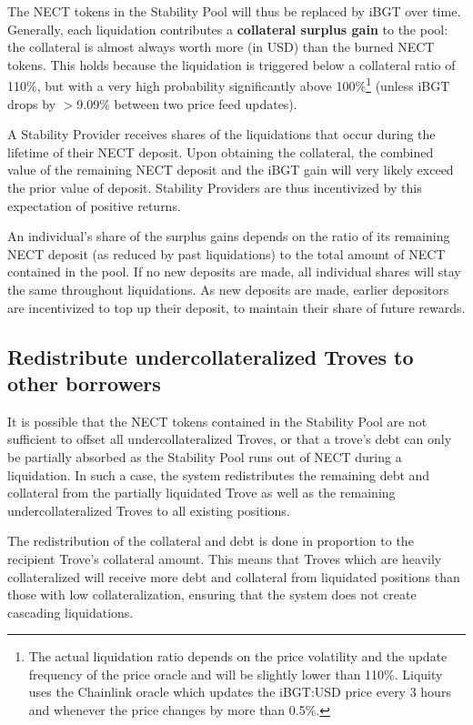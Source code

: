 \documentclass{article}
\begin{document}
The NECT tokens in the Stability Pool will thus be replaced by iBGT over time. Generally, each liquidation contributes a \textbf{collateral surplus gain} to the pool: the collateral is almost always worth more (in USD) than the burned NECT tokens. This holds because the liquidation is triggered below a collateral ratio of 110\%, but with a very high probability significantly above 100\%\footnote{The actual liquidation ratio depends on the price volatility and the update frequency of the price oracle and will be slightly lower than 110\%. Liquity uses the Chainlink oracle which updates the iBGT:USD price every 3 hours and whenever the price changes by more than 0.5\%.} (unless iBGT drops by $>$9.09\% between two price feed updates).

A Stability Provider receives shares of the liquidations that occur during the lifetime of their NECT deposit. Upon obtaining the collateral, the combined value of the remaining NECT deposit and the iBGT gain will very likely exceed the prior value of deposit. Stability Providers are thus incentivized by this expectation of positive returns.

An individual’s share of the surplus gains depends on the ratio of its remaining NECT deposit (as reduced by past liquidations) to the total amount of NECT contained in the pool. If no new deposits are made, all individual shares will stay the same throughout liquidations. As new deposits are made, earlier depositors are incentivized to top up their deposit, to maintain their share of future rewards.

\subsection{Redistribute undercollateralized Troves to other borrowers}
It is possible that the NECT tokens contained in the Stability Pool are not sufficient to offset all undercollateralized Troves, or that a trove’s debt can only be partially absorbed as the Stability Pool runs out of NECT during a liquidation. In such a case, the system redistributes the remaining debt and collateral from the partially liquidated Trove as well as the remaining undercollateralized Troves to all existing positions.

The redistribution of the collateral and debt is done in proportion to the recipient Trove’s collateral amount. This means that Troves which are heavily collateralized will receive more debt and collateral from liquidated positions than those with low collateralization, ensuring that the system does not create cascading liquidations.\\
\end{document}
